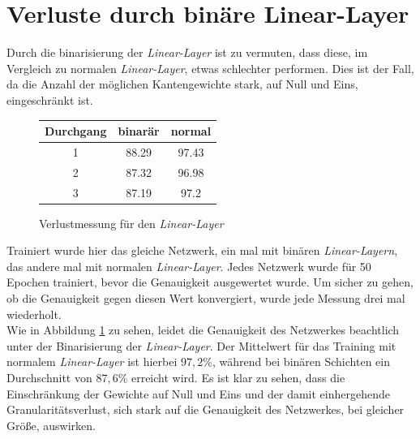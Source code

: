 \section{Verluste durch binäre Linear-Layer}
Durch die binarisierung der \textit{Linear-Layer} ist zu vermuten, dass diese, im Vergleich zu normalen \textit{Linear-Layer}, etwas schlechter performen. Dies ist der Fall, da die Anzahl der möglichen Kantengewichte stark, auf Null und Eins, eingeschränkt ist. 
\begin{figure}[h]
	\centering
	\begin{tabular}{|c|c|c|}\hline
		Durchgang&binarär&normal\\\hline
		1&88.29&97.43\\\hline
		2&87.32&96.98\\\hline
		3&87.19&97.2\\\hline
	\end{tabular}
\caption{Verlustmessung für den \textit{Linear-Layer}}
\label{fig:linar-layer-verluste}
\end{figure}


Trainiert wurde hier das gleiche Netzwerk, ein mal mit binären \textit{Linear-Layern}, das andere mal mit normalen \textit{Linear-Layer}. Jedes Netzwerk wurde für 50 Epochen trainiert, bevor die Genauigkeit ausgewertet wurde. Um sicher zu gehen, ob die Genauigkeit gegen diesen Wert konvergiert, wurde jede Messung drei mal wiederholt.\\
Wie in Abbildung \ref{fig:linar-layer-verluste} zu sehen, leidet die Genauigkeit des Netzwerkes beachtlich unter der Binarisierung der \textit{Linear-Layer}. Der Mittelwert für das Training mit normalem \textit{Linear-Layer} ist hierbei $97,2\%$, während bei binären Schichten ein Durchschnitt von $87,6\%$ erreicht wird. Es ist klar zu sehen, dass die Einschränkung der Gewichte auf Null und Eins und der damit einhergehende Granularitätsverlust, sich stark auf die Genauigkeit des Netzwerkes, bei gleicher Größe, auswirken. 

